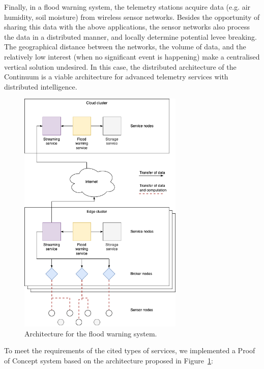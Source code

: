 Finally, in a flood warning system, the telemetry stations acquire data (e.g. air humidity, soil moisture) from wireless sensor networks. Besides the opportunity of sharing this data with the above applications, the sensor networks also process the data in a distributed manner, and locally determine potential levee breaking. The geographical distance between the networks, the volume of data, and the relatively low interest (when no significant event is happening) make a centralised vertical solution undesired. In this case, the distributed architecture of the Continuum is a viable architecture for advanced telemetry services with distributed intelligence.

\begin{figure}[ht]
\centering
\includegraphics[width=0.7\textwidth]{figures/architecture-levee2}
\caption{Architecture for the flood warning system.}
\label{fig:architecture-levee}
\end{figure}

To meet the requirements of the cited types of services, we implemented a Proof of Concept system based on the architecture proposed in Figure~\ref{fig:architecture-levee}:

